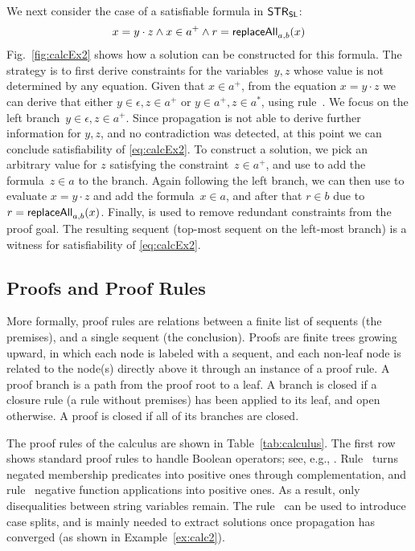 \begin{example}
  \label{ex:calc2}
  We next consider the case of a satisfiable formula in $\mathsf{STR}_{\mathsf{SL}}$:
  \begin{equation}
    \label{eq:calcEx2}
    x = y \cdot z \wedge x \in a^+ \wedge r = \mathsf{replaceAll}_{a, b}(x)
  \end{equation}
  Fig.~\ref{fig:calcEx2} shows how a solution can be constructed for
  this formula. The strategy is to first derive constraints for the
  variables~$y, z$ whose value is not determined by any
  equation. Given that $x \in a^+$, from the equation $x = y \cdot z$
  we can derive that either $y \in \epsilon, z \in a^+$ or
  $y \in a^+, z \in a^*$, using rule~. We focus on
  the left branch~$y \in \epsilon, z \in a^+$. Since propagation is
  not able to derive further information for $y, z$, and no
  contradiction was detected, at this point we can conclude
  satisfiability of \eqref{eq:calcEx2}. To construct a solution, we
  pick an arbitrary value for $z$ satisfying the
  constraint~$z \in a^+$, and use  to add the
  formula~$z \in a$ to the branch. Again following the left branch, we
  can then use  to evaluate $x = y\cdot z$ and
  add the formula~$x \in a$, and after that $r \in b$ due to
  $r = \mathsf{replaceAll}_{a, b}(x)$. Finally,  is used to
  remove redundant \regexp{} constraints from the proof goal. The
  resulting sequent (top-most sequent on the left-most branch) is a
  witness for satisfiability of \eqref{eq:calcEx2}.
\end{example}

\subsection{Proofs and Proof Rules}
\label{sec:rules}

More formally, proof rules are relations between a finite list of
sequents (the premises), and a single sequent (the conclusion). Proofs
are finite trees growing upward, in which each node is labeled with a
sequent, and each non-leaf node is related to the node(s) directly
above it through an instance of a proof rule. A proof branch is a path
from the proof root to a leaf. A branch is closed if a closure rule (a
rule without premises) has been applied to its leaf, and open
otherwise. A proof is closed if all of its branches are closed.

The proof rules of the calculus are shown in
Table~\ref{tab:calculus}. The first row shows standard proof rules to
handle Boolean operators; see, e.g.,
\cite{DBLP:books/daglib/0022394}. Rule~ turns
negated membership predicates into positive ones through
complementation, and rule~ negative function
applications into positive ones. As a result, only disequalities
between string variables remain. The rule~ can be used to
introduce case splits, and is mainly needed to extract solutions once
propagation has converged (as shown in Example~\ref{ex:calc2}).

